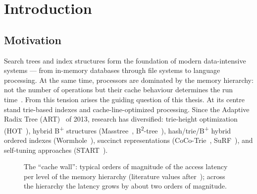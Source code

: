 \chapter{Introduction}\label{ch:intro}


\section{Motivation}\label{sec:motivation}
Search trees and index structures form the foundation of modern data-intensive systems --- from in-memory
databases through file systems to language processing. At the same time, processors are dominated by the
memory hierarchy: not the number of operations but their cache behaviour determines the run
time~\cite{hennessy2019architecture, drepper2007memory, wulf1995memorywall}. From this tension arises
the guiding question of this thesis.
At its centre stand trie-based indexes and cache-line-optimized processing. Since the
Adaptive Radix Tree (ART)~\cite{leis2013art} of 2013, research has diversified: trie-height
optimization (HOT~\cite{binna2018hot}), hybrid B\textsuperscript{+} structures
(Masstree~\cite{mao2012masstree}, B\textsuperscript{2}-tree~\cite{schmeisser2022b2tree}),
hash/trie/B\textsuperscript{+} hybrid ordered indexes (Wormhole~\cite{wu2019wormhole}), succinct
representations (CoCo-Trie~\cite{boffa2024coco}, SuRF~\cite{zhang2018surf}), and self-tuning
approaches (START~\cite{fent2020start}).

\begin{nurlang}
\begin{figure}[htbp]\centering
{}
\caption{The \enquote{cache wall}: typical orders of magnitude of the access latency per level of the
memory hierarchy (literature values after~\cite{hennessy2019architecture, drepper2007memory}); across the
hierarchy the latency grows by about two orders of magnitude.}\label{fig:cache-wall}
\end{figure}
\end{nurlang}


